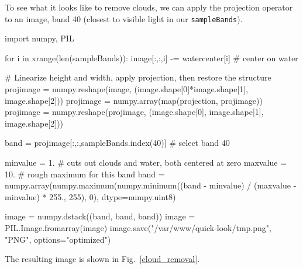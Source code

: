 \documentclass[12pt]{article}
\begin{document}
To see what it looks like to remove clouds, we can apply the
projection operator to an image, band 40 (closest to visible light in
our {\tt sampleBands}).

\begin{python}
import numpy, PIL

for i in xrange(len(sampleBands)):
    image[:,:,i] -= watercenter[i]    # center on water

# Linearize height and width, apply projection, then restore the structure
projimage = numpy.reshape(image,
                          (image.shape[0]*image.shape[1], image.shape[2]))
projimage = numpy.array(map(projection, projimage))
projimage = numpy.reshape(projimage,
                          (image.shape[0], image.shape[1], image.shape[2]))

band = projimage[:,:,sampleBands.index(40)]  # select band 40

minvalue = 1.   # cuts out clouds and water, both centered at zero
maxvalue = 10.  # rough maximum for this band
band = numpy.array(numpy.maximum(numpy.minimum((band - minvalue) /
                   (maxvalue - minvalue) * 255., 255), 0), dtype=numpy.uint8)

image = numpy.dstack((band, band, band))
image = PIL.Image.fromarray(image)
image.save("/var/www/quick-look/tmp.png", "PNG", options="optimized")
\end{python}

The resulting image is shown in Fig.~\ref{cloud_removal}.
\end{document}
